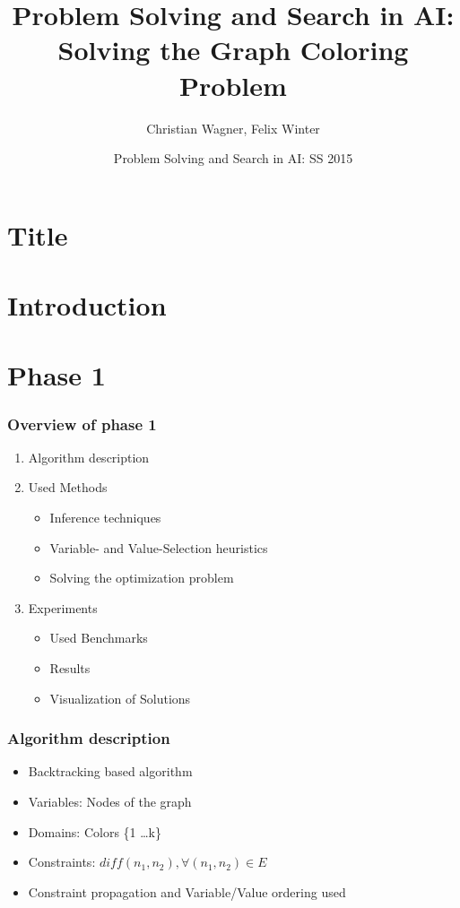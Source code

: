 \documentclass{beamer}
\title[Solving the Graph Coloring Problem] %
{Problem Solving and Search in AI: Solving the Graph Coloring
Problem}
\author{Christian Wagner, Felix Winter}
\institute
{
  TU Wien  
}
\date[SS 2015] %
{Problem Solving and Search in AI: SS 2015}
\begin{document}
\section{Title}
  \frame{\titlepage}


\section{Introduction}




\section{Phase 1}
  \begin{frame}
    \frametitle{Overview of phase 1}

    \begin{enumerate}
      \item Algorithm description
      \item Used Methods
        \begin{itemize}
        \item{Inference techniques}
        \item{Variable- and Value-Selection heuristics}
        \item{Solving the optimization problem}
        \end{itemize}
        
      \item{Experiments}
        \begin{itemize}
        \item{Used Benchmarks}
        \item{Results}
        \item{Visualization of Solutions}
        \end{itemize}

    \end{enumerate}
  \end{frame}


  \begin{frame}
    \frametitle{Algorithm description}
    \begin{itemize}
    \item{Backtracking based algorithm}
    \item{Variables: Nodes of the graph}
    \item{Domains: Colors \{1 \dots k\}}
    \item{Constraints: $diff(n_1, n_2),  \forall (n_1, n_2) \in E$}
    \item{Constraint propagation and Variable/Value ordering used}
    \end{itemize}


  \end{frame}
\end{document}
